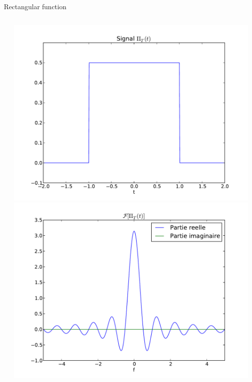 \begin{exampleblock}{Rectangular function}
\begin{columns}
\begin{column}
          \end{column}
          \begin{column}%
            \begin{center}
            \includegraphics[width=.45\columnwidth]{imgs/fourier/sig_porte_ft.pdf}
            \includegraphics[width=.45\columnwidth]{imgs/fourier/ft_sig_porte_ft.pdf}
          \end{center}
         \end{column}
        \end{columns}
    
    
      \end{exampleblock}


